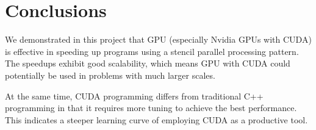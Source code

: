 \documentclass{article}
\begin{document}
\section{Conclusions}
%
We demonstrated in this project that GPU (especially Nvidia GPUs with CUDA)
is effective in speeding up programs 
using a stencil parallel processing pattern.
%
The speedups exhibit good scalability, which means GPU with CUDA could potentially 
be used in problems with much larger scales.


At the same time, CUDA programming differs from traditional C++ programming
in that it requires more tuning to achieve the best performance.
%
This indicates a steeper learning curve of employing CUDA as a productive tool.

 

%
%





\end{document}
